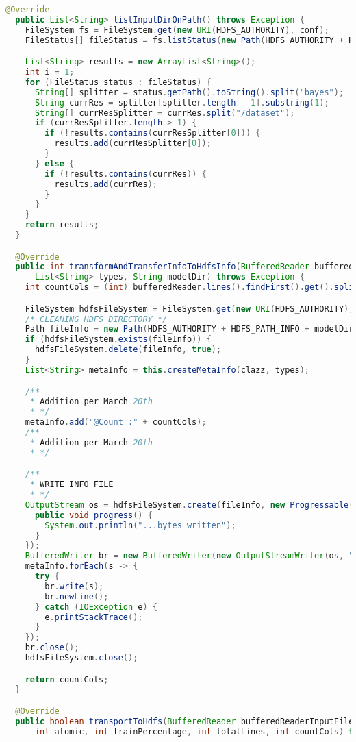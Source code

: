 \begin{lstlisting}[language=Java,basicstyle=\tiny,caption=HdfsServiceImpl.java]
  @Override
  public List<String> listInputDirOnPath() throws Exception {
    FileSystem fs = FileSystem.get(new URI(HDFS_AUTHORITY), conf);
    FileStatus[] fileStatus = fs.listStatus(new Path(HDFS_AUTHORITY + HDFS_PATH));

    List<String> results = new ArrayList<String>();
    int i = 1;
    for (FileStatus status : fileStatus) {
      String[] splitter = status.getPath().toString().split("bayes");
      String currRes = splitter[splitter.length - 1].substring(1);
      String[] currResSplitter = currRes.split("/dataset");
      if (currResSplitter.length > 1) {
        if (!results.contains(currResSplitter[0])) {
          results.add(currResSplitter[0]);
        }
      } else {
        if (!results.contains(currRes)) {
          results.add(currRes);
        }
      }
    }
    return results;
  }

  @Override
  public int transformAndTransferInfoToHdfsInfo(BufferedReader bufferedReader, List<String> clazz,
      List<String> types, String modelDir) throws Exception {
    int countCols = (int) bufferedReader.lines().findFirst().get().split(regex).length;

    FileSystem hdfsFileSystem = FileSystem.get(new URI(HDFS_AUTHORITY), conf);
    /* CLEANING HDFS DIRECTORY */
    Path fileInfo = new Path(HDFS_AUTHORITY + HDFS_PATH_INFO + modelDir + "/info/meta.info");
    if (hdfsFileSystem.exists(fileInfo)) {
      hdfsFileSystem.delete(fileInfo, true);
    }
    List<String> metaInfo = this.createMetaInfo(clazz, types);

    /**
     * Addition per March 20th
     * */
    metaInfo.add("@Count :" + countCols);
    /**
     * Addition per March 20th
     * */

    /**
     * WRITE INFO FILE
     * */
    OutputStream os = hdfsFileSystem.create(fileInfo, new Progressable() {
      public void progress() {
        System.out.println("...bytes written");
      }
    });
    BufferedWriter br = new BufferedWriter(new OutputStreamWriter(os, "UTF-8"));
    metaInfo.forEach(s -> {
      try {
        br.write(s);
        br.newLine();
      } catch (IOException e) {
        e.printStackTrace();
      }
    });
    br.close();
    hdfsFileSystem.close();

    return countCols;
  }

  @Override
  public boolean transportToHdfs(BufferedReader bufferedReaderInputFile, String modelDir,
      int atomic, int trainPercentage, int totalLines, int countCols) throws Exception {


\end{lstlisting}
